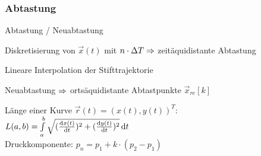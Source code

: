\documentclass[german,color,6pt]{latex4ei/latex4ei_sheet}
\begin{document}
\begin{sectionbox}
	\subsubsection{Abtastung}
		\begin{cookbox}{Abtastung / Neuabtastung}
			\item Diskretisierung von $\vec x(t)$ mit $n \cdot \Delta T \Rightarrow $ zeitäquidistante Abtastung
			\item Lineare Interpolation der Stifttrajektorie
			\item Neuabtastung $\Rightarrow$ ortsäquidistante Abtastpunkte $\vec x_{re}[k]$
		\end{cookbox}

		Länge einer Kurve $\vec r(t) = (x(t),y(t))^T$:\\
		$L(a,b) = \int \limits_a^b \sqrt{(\frac{\diff x(t)}{\diff t})^2 + (\frac{\diff y(t)}{\diff t})^2} \diff t$\\

		Druckkomponente: $p_n = p_1 + k\cdot(p_2 - p_1)$
\end{sectionbox}
\end{document}

